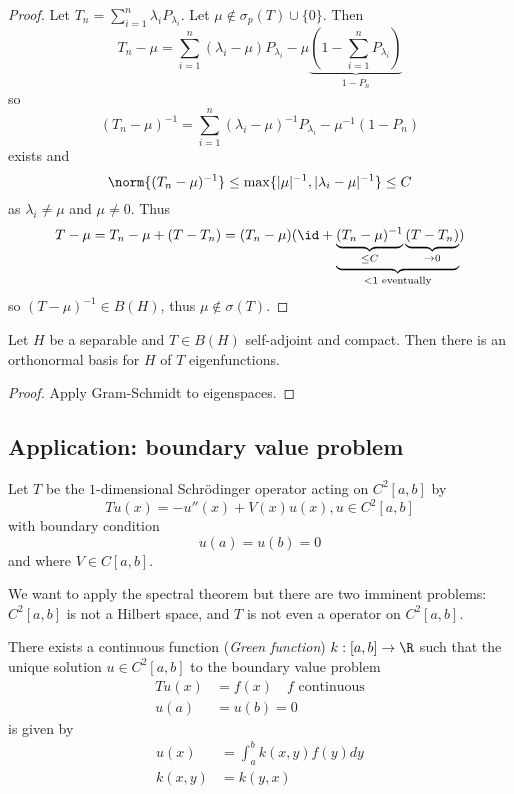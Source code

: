 \documentclass[a4paper]{article}
\begin{document}
\begin{proof}
  Let \(T_n = \sum_{i = 1}^n \lambda_iP_{\lambda_i}\). Let \(\mu \notin \sigma_p(T) \cup \{0\}\). Then
  \[
    T_n - \mu
    = \sum_{i = 1}^n (\lambda_i - \mu) P_{\lambda_i} - \mu \underbrace{(1 - \sum_{i = 1}^n P_{\lambda_i})}_{1 - P_n}
  \]
  so
  \[
    (T_n - \mu)^{-1} = \sum_{i = 1}^n (\lambda_i - \mu)^{-1} P_{\lambda_i} - \mu^{-1} (1 - P_n)
  \]
  exists and
  \[
    \norm{(T_n - \mu)^{-1}} \leq \max \{|\mu|^{-1}, |\lambda_i - \mu|^{-1}\} \leq C
  \]
  as \(\lambda_i \neq \mu\) and \(\mu \neq 0\). Thus
  \[
    T - \mu
    = T_n - \mu + (T - T_n)
    = (T_n - \mu) (\id + \underbrace{\underbrace{(T_n - \mu)^{-1}}_{\leq C} \underbrace{(T - T_n)}_{\to 0}}_{< 1 \text{ eventually}})
  \]
  so \((T - \mu)^{-1} \in B(H)\), thus \(\mu \notin \sigma(T)\).
\end{proof}

\begin{corollary}
  Let \(H\) be a separable and \(T \in B(H)\) self-adjoint and compact. Then there is an orthonormal basis for \(H\) of \(T\) eigenfunctions.
\end{corollary}

\begin{proof}
  Apply Gram-Schmidt to eigenspaces.
\end{proof}

\subsection{Application: boundary value problem}

Let \(T\) be the \(1\)-dimensional Schrödinger operator acting on \(C^2[a, b]\) by
\[
  Tu(x) = -u''(x) + V(x) u(x), u \in C^2[a, b]
\]
with boundary condition
\[
  u(a) = u(b) = 0
\]
and where \(V \in C[a, b]\).

We want to apply the spectral theorem but there are two imminent problems: \(C^2[a, b]\) is not a Hilbert space, and \(T\) is not even a operator on \(C^2[a, b]\).

\begin{theorem}
  There exists a continuous function (\emph{Green function}) \(k: [a, b] \to \R\) such that the unique solution \(u \in C^2[a, b]\) to the boundary value problem
  \begin{align*}
    Tu(x) &= f(x) \quad f \text{ continuous} \\
    u(a) &= u(b) = 0
  \end{align*}
  is given by
  \begin{align*}
    u(x) &= \int_a^b k(x, y)f(y) dy \\
    k(x, y) &= k(y, x)
  \end{align*}
\end{theorem}
\end{document}

